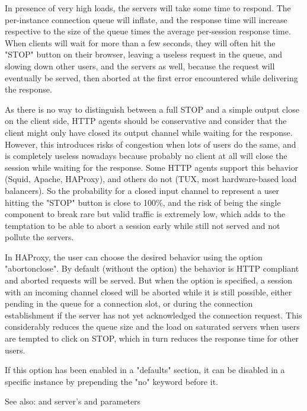   In presence of very high loads, the servers will take some time to respond.
  The per-instance connection queue will inflate, and the response time will
  increase respective to the size of the queue times the average per-session
  response time. When clients will wait for more than a few seconds, they will
  often hit the "STOP" button on their browser, leaving a useless request in
  the queue, and slowing down other users, and the servers as well, because the
  request will eventually be served, then aborted at the first error
  encountered while delivering the response.

  As there is no way to distinguish between a full STOP and a simple output
  close on the client side, HTTP agents should be conservative and consider
  that the client might only have closed its output channel while waiting for
  the response. However, this introduces risks of congestion when lots of users
  do the same, and is completely useless nowadays because probably no client at
  all will close the session while waiting for the response. Some HTTP agents
  support this behavior (Squid, Apache, HAProxy), and others do not (TUX, most
  hardware-based load balancers). So the probability for a closed input channel
  to represent a user hitting the "STOP" button is close to 100\%, and the risk
  of being the single component to break rare but valid traffic is extremely
  low, which adds to the temptation to be able to abort a session early while
  still not served and not pollute the servers.

  In HAProxy, the user can choose the desired behavior using the option
  "abortonclose". By default (without the option) the behavior is HTTP
  compliant and aborted requests will be served. But when the option is
  specified, a session with an incoming channel closed will be aborted while
  it is still possible, either pending in the queue for a connection slot, or
  during the connection establishment if the server has not yet acknowledged
  the connection request. This considerably reduces the queue size and the load
  on saturated servers when users are tempted to click on STOP, which in turn
  reduces the response time for other users.

  If this option has been enabled in a "defaults" section, it can be disabled
  in a specific instance by prepending the "no" keyword before it.


See also:  and server's  and  parameters

\subsubsection[accept-invalid-http-request]{}
